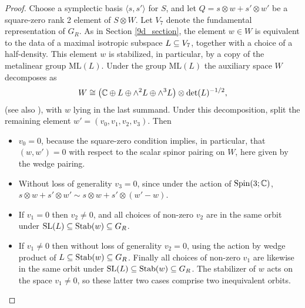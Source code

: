 \documentclass[10pt, oneside]{article}
\newcommand{\ML}{\mathrm{ML}}
\begin{document}
\begin{proof}
Choose a symplectic basis $\langle s, s' \rangle$ for $S$, and let $Q = s \otimes w + s' \otimes w'$ be a square-zero rank 2 element of $S \otimes W$.  Let $V_7$ denote the fundamental representation of $G_R$.  As in Section \ref{9d_section}, the element $w \in W$ is equivalent to the data of a maximal isotropic subspace $L \subseteq V_7$, together with a choice of a half-density.  This element $w$ is stabilized, in particular, by a copy of the metalinear group $\ML(L)$.
Under the group $\ML(L)$ the auxiliary space $W$ decomposes as
\[W \cong \left(\mathbb C \oplus L \oplus \wedge^2 L \oplus \wedge^3 L \right) \otimes \det(L)^{-1/2},\]
(see also \cite[Section 4.7]{ElliottSafronov}), with $w$ lying in the last summand.  Under this decomposition, split the remaining element $w' = (v_0, v_1, v_2, v_3)$.  Then
\begin{itemize}
 \item $v_0 = 0$, because the square-zero condition implies, in particular, that $(w,w') = 0$ with respect to the scalar spinor pairing on $W$, here given by the wedge pairing.
 \item Without loss of generality $v_3 = 0$, since under the action of $\mathrm{Spin}(3;\mathbb C)$, $s \otimes w + s' \otimes w' \sim s \otimes w + s' \otimes (w'-w)$.
 \item If $v_1 = 0$ then $v_2 \ne 0$, and all choices of non-zero $v_2$ are in the same orbit under $\mathrm{SL}(L) \subseteq \operatorname{Stab}(w) \subseteq G_R$.
 \item If $v_1 \ne 0$ then without loss of generality $v_2 = 0$, using the action by wedge product of $L \subseteq \operatorname{Stab}(w) \subseteq G_R$.  Finally all choices of non-zero $v_1$ are likewise in the same orbit under $\mathrm{SL}(L) \subseteq \operatorname{Stab}(w) \subseteq G_R$.  The stabilizer of $w$ acts on the space $v_1 \ne 0$, so these latter two cases comprise two inequivalent orbits.
\end{itemize}
\end{proof}
\end{document}
